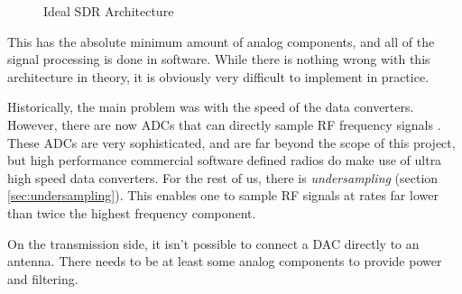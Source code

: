 \documentclass[a4paper, 12pt]{article}
\begin{document}
\begin{figure}[ht]
\caption{Ideal SDR Architecture}
\label{fig:ideal_sdr}
\centering
{}
\end{figure}

This has the absolute minimum amount of analog components, and all of the signal processing is done in software.  While there is nothing wrong with this architecture in theory, it is obviously very difficult to implement in practice.  

Historically, the main problem was with the speed of the data converters.  However, there are now ADCs that can directly sample RF frequency signals \cite{gsps_adc}.  These ADCs are very sophisticated, and are far beyond the scope of this project, but high performance commercial software defined radios do make use of ultra high speed data converters.  For the rest of us, there is \textit{undersampling} (section \ref{sec:undersampling}).  This enables one to sample RF signals at rates far lower than twice the highest frequency component.

On the transmission side, it isn't possible to connect a DAC directly to an antenna.  There needs to be at least some analog components to provide power and filtering.
\end{document}
